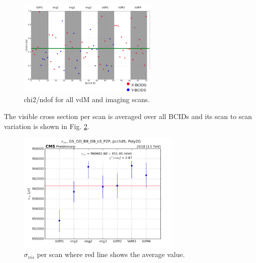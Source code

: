 \begin{figure}[h]
    \centering
    \includegraphics[width=0.6\textwidth]{ashish_thesis/fit_quality_chisquare.png}
    \caption{chi2/ndof for all vdM and imaging scans.}
    \label{fig:fitquality}
\end{figure}


The visible cross section per scan is averaged over all BCIDs and its scan to scan variation is shown in Fig. \ref{fig:sigmaperscan}.


\begin{figure}[h]
    \centering
    \includegraphics[width=0.7\textwidth]{ashish_thesis/sigma_vis_per_scan.png}
    \caption{$\sigma_{vis}$ per scan where red line shows the average value.}
    \label{fig:sigmaperscan}
\end{figure}

























